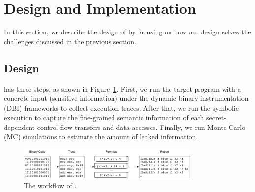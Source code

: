 \section{Design and Implementation}
In this section, we describe the design of \tool{} by focusing on how our design
solves the challenges discussed in the previous section.

\subsection{Design}
\tool{} has three steps,
as shown in Figure~\ref{fig:workflow}. First, we run the target program with a
concrete input (sensitive information) under the dynamic binary instrumentation
(DBI) frameworks to collect execution traces. After that, we run the symbolic
execution to capture the fine-grained semantic information of each
secret-dependent control-flow transfers and data-accesses. Finally, we run Monte
Carlo (MC) simulations to estimate the amount of leaked information.

\begin{figure}[t]
    \centering
    \includegraphics[width=0.8\textwidth]{./figures/workflow.pdf}
    \caption{The workflow of \tool{}.}
    \label{fig:workflow}
\end{figure}

